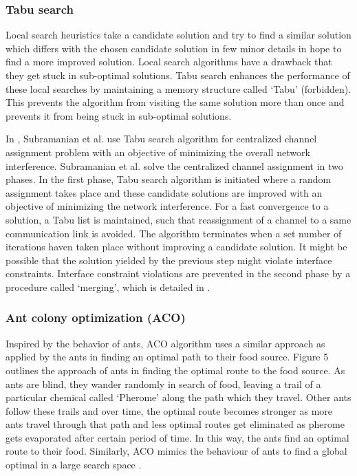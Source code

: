 \documentclass[conference]{IEEEtran}
\begin{document}
\subsubsection{Tabu search}
	Local search heuristics take a candidate solution and try to find a similar solution which differs with the chosen candidate solution in few minor details in hope to find a more improved solution. Local search algorithms have a drawback that they get stuck in sub-optimal solutions. Tabu search enhances the performance of these local searches by maintaining a memory structure called `Tabu' (forbidden). This prevents the algorithm from visiting the same solution more than once and prevents it from being stuck in sub-optimal solutions. 
    
    In \cite{12}, Subramanian et al. use Tabu search algorithm for centralized channel assignment problem with an objective of minimizing the overall network interference. Subramanian et al. solve the centralized channel assignment in two phases. In the first phase, Tabu search algorithm is initiated where a random assignment takes place and these candidate solutions are improved with an objective of minimizing the network interference. For a fast convergence to a solution, a Tabu list is maintained, such that reassignment of a channel to a same communication link is avoided. The algorithm terminates when a set number of iterations haven taken place without improving a candidate solution. It might be possible that the solution yielded by the previous step might violate interface constraints. Interface constraint violations are prevented in the second phase by a procedure called `merging', which is detailed in \cite{12}.

\subsubsection{Ant colony optimization (ACO)}
	Inspired by the behavior of ants, ACO algorithm uses a similar approach as applied by the ants in finding an optimal path to their food source. Figure 5 outlines the approach of ants in finding the optimal route to the food source. As ants are blind, they wander randomly in search of food, leaving a trail of a particular chemical called `Pherome' along the path which they travel. Other ants follow these trails and over time, the optimal route becomes stronger as more ants travel through that path and less optimal routes get eliminated as pherome gets evaporated after certain period of time. In this way, the ants find an optimal route to their food. Similarly, ACO mimics the behaviour of ants to find a global optimal in a large search space \cite{6}.
\end{document}
